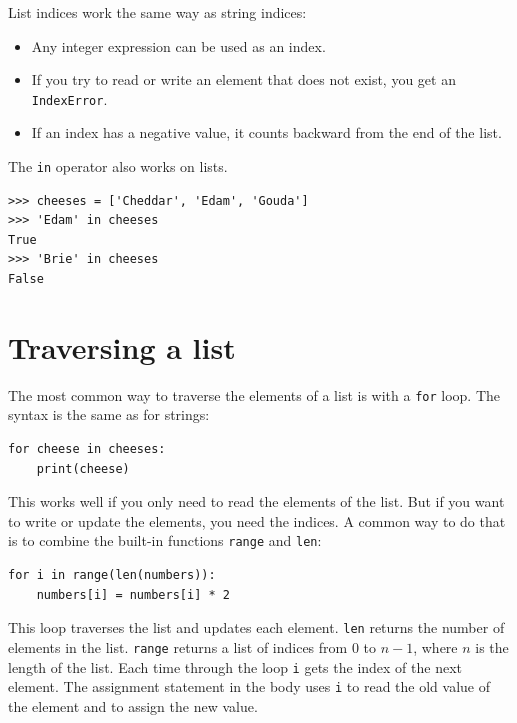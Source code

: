 \documentclass[10pt]{book}
\begin{document}
List indices work the same way as string indices:

\begin{itemize}

\item Any integer expression can be used as an index.

\item If you try to read or write an element that does not exist, you
get an {\tt IndexError}.

\item If an index has a negative value, it counts backward from the
end of the list.

\end{itemize}


The {\tt in} operator also works on lists.

\begin{verbatim}
>>> cheeses = ['Cheddar', 'Edam', 'Gouda']
>>> 'Edam' in cheeses
True
>>> 'Brie' in cheeses
False
\end{verbatim}


\section{Traversing a list}

The most common way to traverse the elements of a list is
with a {\tt for} loop.  The syntax is the same as for strings:

\begin{verbatim}
for cheese in cheeses:
    print(cheese)
\end{verbatim}
%
This works well if you only need to read the elements of the
list.  But if you want to write or update the elements, you
need the indices.  A common way to do that is to combine
the built-in functions {\tt range} and {\tt len}:

\begin{verbatim}
for i in range(len(numbers)):
    numbers[i] = numbers[i] * 2
\end{verbatim}
%
This loop traverses the list and updates each element.  {\tt len}
returns the number of elements in the list.  {\tt range} returns
a list of indices from 0 to $n-1$, where $n$ is the length of
the list.  Each time through the loop {\tt i} gets the index
of the next element.  The assignment statement in the body uses
{\tt i} to read the old value of the element and to assign the
new value.
\end{document}
